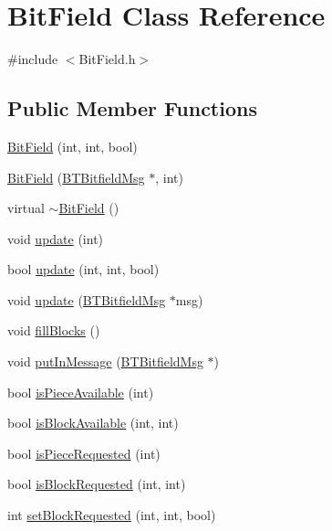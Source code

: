 \hypertarget{classBitField}{}\section{Bit\+Field Class Reference}
\label{classBitField}


{\ttfamily \#include $<$Bit\+Field.\+h$>$}

\subsection*{Public Member Functions}
\begin{DoxyCompactItemize}
\item 
\hyperlink{classBitField_a1c2fa43c831330abdfcf561403e4702a}{Bit\+Field} (int, int, bool)
\item 
\hyperlink{classBitField_aabc26baca38da071e537309ac3054711}{Bit\+Field} (\hyperlink{classBTBitfieldMsg}{B\+T\+Bitfield\+Msg} $\ast$, int)
\item 
virtual \hyperlink{classBitField_ace6c4b4b88b610b8b960dca27ce0e327}{$\sim$\+Bit\+Field} ()
\item 
void \hyperlink{classBitField_a44f5269832b8e569436defa583940583}{update} (int)
\item 
bool \hyperlink{classBitField_a68303775853513b2dce8e6143f03acac}{update} (int, int, bool)
\item 
void \hyperlink{classBitField_afab731950ba15b13b2cecfc03f2309f7}{update} (\hyperlink{classBTBitfieldMsg}{B\+T\+Bitfield\+Msg} $\ast$msg)
\item 
void \hyperlink{classBitField_acc9bc492966e1ae3122761245fd3adb1}{fill\+Blocks} ()
\item 
void \hyperlink{classBitField_a76f983ecfbe3ff2b9c5bbd942b874b61}{put\+In\+Message} (\hyperlink{classBTBitfieldMsg}{B\+T\+Bitfield\+Msg} $\ast$)
\item 
bool \hyperlink{classBitField_aa849078186430ec77a4c59e668e5fd06}{is\+Piece\+Available} (int)
\item 
bool \hyperlink{classBitField_a51fc08f5f0cbfc7e264867ce3384923e}{is\+Block\+Available} (int, int)
\item 
bool \hyperlink{classBitField_a6c2724efafba0b901919439e73bfe92f}{is\+Piece\+Requested} (int)
\item 
bool \hyperlink{classBitField_a4f694bc138ca12894182ee60cd80d8d9}{is\+Block\+Requested} (int, int)
\item 
int \hyperlink{classBitField_a87f3cca7acd6cbdb356e433c0419c3f4}{set\+Block\+Requested} (int, int, bool)

\end{DoxyCompactItemize}
